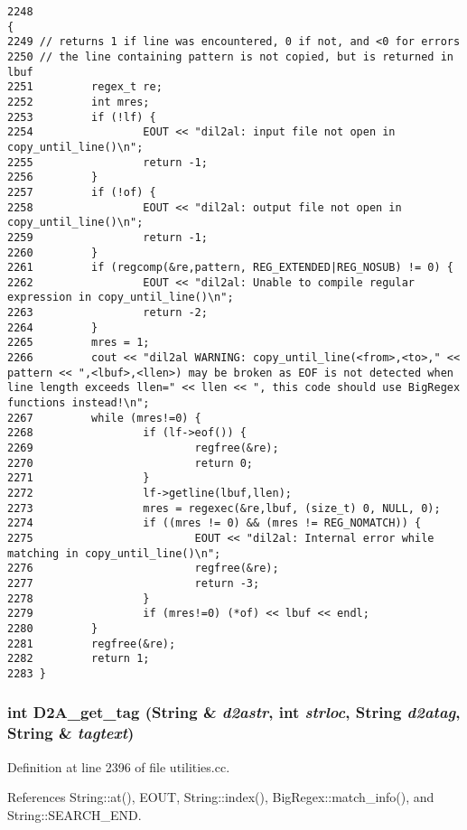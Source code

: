 \footnotesize\begin{verbatim}2248                                                                                                {
2249 // returns 1 if line was encountered, 0 if not, and <0 for errors
2250 // the line containing pattern is not copied, but is returned in lbuf
2251         regex_t re;
2252         int mres;
2253         if (!lf) {
2254                 EOUT << "dil2al: input file not open in copy_until_line()\n";
2255                 return -1;
2256         }
2257         if (!of) {
2258                 EOUT << "dil2al: output file not open in copy_until_line()\n";
2259                 return -1;
2260         }
2261         if (regcomp(&re,pattern, REG_EXTENDED|REG_NOSUB) != 0) {
2262                 EOUT << "dil2al: Unable to compile regular expression in copy_until_line()\n";
2263                 return -2;
2264         }
2265         mres = 1;
2266         cout << "dil2al WARNING: copy_until_line(<from>,<to>," << pattern << ",<lbuf>,<llen>) may be broken as EOF is not detected when line length exceeds llen=" << llen << ", this code should use BigRegex functions instead!\n";
2267         while (mres!=0) {
2268                 if (lf->eof()) {
2269                         regfree(&re);
2270                         return 0;
2271                 }
2272                 lf->getline(lbuf,llen);
2273                 mres = regexec(&re,lbuf, (size_t) 0, NULL, 0);
2274                 if ((mres != 0) && (mres != REG_NOMATCH)) {
2275                         EOUT << "dil2al: Internal error while matching in copy_until_line()\n";
2276                         regfree(&re);
2277                         return -3;
2278                 }
2279                 if (mres!=0) (*of) << lbuf << endl;
2280         }
2281         regfree(&re);
2282         return 1;
2283 }
\end{verbatim}\normalsize 
{}
\subsubsection{\setlength{\rightskip}{0pt plus 5cm}int D2A\_\-get\_\-tag ({\bf String} \& {\em d2astr}, int {\em strloc}, {\bf String} {\em d2atag}, {\bf String} \& {\em tagtext})}\label{utilities_8cc_a50}




Definition at line 2396 of file utilities.cc.

References String::at(), EOUT, String::index(), Big\-Regex::match\_\-info(), and String::SEARCH\_\-END.

